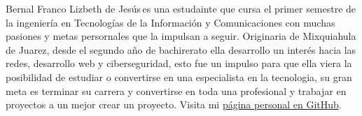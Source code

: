 \documentclass{IEEEcsmag}
\begin{document}
\begin{IEEEbiography}{Bernal Franco Lizbeth de Jesús}{\,}es una estudainte que cursa el primer semestre de la ingeniería en Tecnologías de la Información y Comunicaciones con muchas pasiones y metas persornales que la impulsan a seguir. Originaria de Mixquiahula de Juarez, desde el segundo año de bachirerato ella desarrollo un interés hacia las redes, desarrollo web y ciberseguridad, esto fue un impulso para que ella viera la posibilidad de estudiar o convertirse en una especialista en la tecnologia, su gran meta es terminar su carrera y convertirse en toda una profesional y trabajar en proyectos a un mejor crear un proyecto. Visita mi \href{https://lizbernal.github.io/}{página personal en GitHub}.
\end{IEEEbiography}
\end{document}
